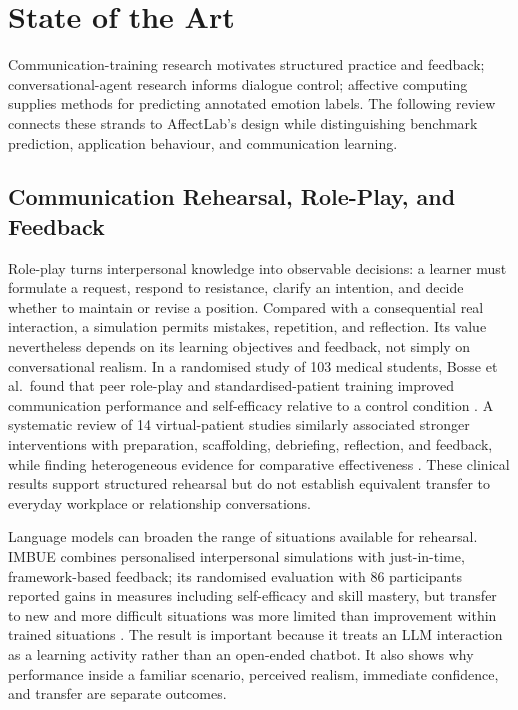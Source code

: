 \chapter{State of the Art}\label{chap2}

Communication-training research motivates structured practice and feedback; conversational-agent research informs dialogue control; affective computing supplies methods for predicting annotated emotion labels. The following review connects these strands to AffectLab's design while distinguishing benchmark prediction, application behaviour, and communication learning.

\section{Communication Rehearsal, Role-Play, and Feedback}
\label{sec:sota-rehearsal}
\label{sec:sota-feedback}

Role-play turns interpersonal knowledge into observable decisions: a learner must formulate a request, respond to resistance, clarify an intention, and decide whether to maintain or revise a position. Compared with a consequential real interaction, a simulation permits mistakes, repetition, and reflection. Its value nevertheless depends on its learning objectives and feedback, not simply on conversational realism. In a randomised study of 103 medical students, Bosse et al.\ found that peer role-play and standardised-patient training improved communication performance and self-efficacy relative to a control condition \cite{bosse2012roleplay}. A systematic review of 14 virtual-patient studies similarly associated stronger interventions with preparation, scaffolding, debriefing, reflection, and feedback, while finding heterogeneous evidence for comparative effectiveness \cite{lee2020virtualpatients}. These clinical results support structured rehearsal but do not establish equivalent transfer to everyday workplace or relationship conversations.

Language models can broaden the range of situations available for rehearsal. IMBUE combines personalised interpersonal simulations with just-in-time, framework-based feedback; its randomised evaluation with 86 participants reported gains in measures including self-efficacy and skill mastery, but transfer to new and more difficult situations was more limited than improvement within trained situations \cite{lin2024imbue}. The result is important because it treats an LLM interaction as a learning activity rather than an open-ended chatbot. It also shows why performance inside a familiar scenario, perceived realism, immediate confidence, and transfer are separate outcomes.

